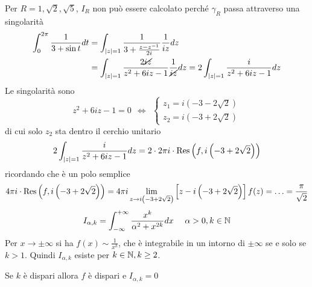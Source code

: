 Per $R = 1, \sqrt{2}, \sqrt{5}$, $I_{R}$ non può essere calcolato perché $\gamma_{R}$ passa attraverso una singolarità
\Soluzione
\begin{align*}
\int^{2\pi}_{0}\frac{1}{3 + \sin t} dt & = \int_{\left| z\right| = 1}\frac{1}{3 + \frac{z - z^{- 1}}{2i}}\frac{1}{iz} dz\\
 & = \int_{\left| z\right| = 1}\frac{2\cancel{iz}}{z^{2} + 6iz - 1}\frac{1}{\cancel{iz}} dz = 2\int_{\left| z\right| = 1}\frac{i}{z^{2} + 6iz - 1} dz
\end{align*}
Le singolarità sono
\begin{equation*}
z^{2} + 6iz - 1 = 0\ \ \iff \ \ 
\begin{cases}
z_{1} = i\left(- 3 - 2\sqrt{2}\right)\\
z_{2} = i\left(- 3 + 2\sqrt{2}\right)
\end{cases}
\end{equation*}
di cui solo $z_{2}$ sta dentro il cerchio unitario
\begin{equation*}
2\int_{\left| z\right| = 1}\frac{i}{z^{2} + 6iz - 1} dz = 2 \cdot 2\pi i \cdot \operatorname{Res} \left(f, i\left(- 3 + 2\sqrt{2}\right)\right)
\end{equation*}
ricordando che è un polo semplice
\begin{equation*}
4\pi i \cdot \operatorname{Res} \left(f, i\left(- 3 + 2\sqrt{2}\right)\right) = 4\pi i\lim\limits_{z\rightarrow i\left(- 3 + 2\sqrt{2}\right)}\left[ z - i\left(- 3 + 2\sqrt{2}\right)\right] f(z) = \dotsc = \frac{\pi}{\sqrt{2}}
\end{equation*}
\Soluzione
\begin{equation*}
I_{\alpha, k} = \int^{+ \infty}_{- \infty}\frac{x^{k}}{\alpha^{2} + x^{2k}} dx\ \ \ \ \alpha  > 0, k\in \mathbb{N} 
\end{equation*}
Per $x\rightarrow \pm \infty $ si ha $f(x) \sim \frac{1}{x^{k}}$, che è integrabile in un intorno di $\pm \infty $ se e solo se $k > 1$. Quindi $I_{\alpha, k}$ esiste per $k\in \mathbb{N}, k \geq 2$.

Se $k$ è dispari allora $f$ è dispari e $I_{\alpha, k} = 0$

